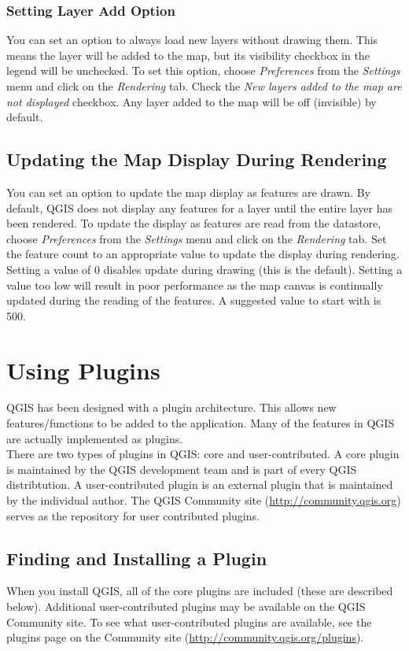 \documentclass[10pt,english]{article}
\begin{document}
\begin{onehalfspace}
\subsubsection{Setting Layer Add
Option}
You can set an option to always load new layers without drawing them. This means
the layer will be added to the map, but its visibility checkbox in the legend
will be unchecked. To set this option, choose \textit{Preferences} from the
\textit{Settings} menu and click on the \textit{Rendering} tab. Check the
\textit{New layers added to the map are not displayed} checkbox. Any layer added
to the map will be off (invisible) by default.
\subsection{Updating the Map Display During Rendering}
You can set an option to update the map display as features are drawn. By
default, QGIS does not display any features for a layer until the entire layer
has been rendered. To update the display as features are read from the
datastore, choose \textit{Preferences} from the
\textit{Settings} menu and click on the \textit{Rendering} tab. Set the feature
count to an appropriate value to update the display during rendering. Setting a
value of 0 disables update during drawing (this is the default). Setting a value
too low will result in poor performance as the map canvas is continually updated
during the reading of the features. A suggested value to start with is 500. 

\section{Using Plugins}
QGIS has been designed with a plugin architecture. This allows new features/functions to be added to the application. Many of the features in QGIS are actually implemented as plugins.\\

There are two types of plugins in QGIS: core and user-contributed.
A core plugin is maintained by the QGIS development team and is part of every QGIS distribtution. A user-contributed plugin is an external plugin that is maintained by the individual author. The QGIS Community site (\url{http://community.qgis.org}) serves as the repository for user contributed plugins.

\subsection{Finding and Installing a Plugin}
When you install QGIS, all of the core plugins are included (these are described
below). Additional user-contributed plugins may be
available on the QGIS Community site. To see what user-contributed plugins are
available, see the plugins page on the Community site
(\url{http://community.qgis.org/plugins}).\\


\end{onehalfspace}
\end{document}
